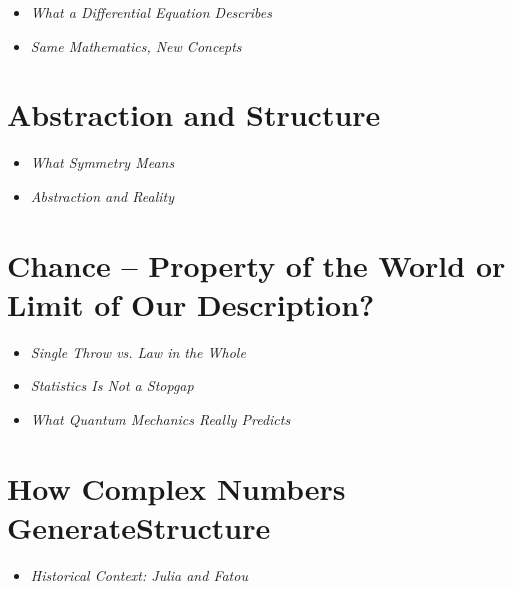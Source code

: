 \begin{DidacticBox}
	\begin{itemize}
		\item \emph{What a Differential Equation Describes}\dotfill \pageref{box:differential}
		\item \emph{Same Mathematics, New Concepts}\dotfill \pageref{box:newconcepts}
	\end{itemize}
\end{DidacticBox}

\section{Abstraction and Structure}
\begin{DidacticBox}
	\begin{itemize}
		\item \emph{What Symmetry Means}\dotfill \pageref{box:symmetry}
		\item \emph{Abstraction and Reality}\dotfill \pageref{box:abstraction}
	\end{itemize}
\end{DidacticBox}

\section{Chance -- Property of the World or Limit of Our Description?}

\begin{DidacticBox}
	\begin{itemize}
		\item \emph{Single Throw vs. Law in the Whole}\dotfill \pageref{box:singlethrow}
		\item \emph{Statistics Is Not a Stopgap}\dotfill \pageref{box:statistics}
		\item \emph{What Quantum Mechanics Really Predicts}\dotfill \pageref{box:predicts}
	\end{itemize}
\end{DidacticBox}

\section{How Complex Numbers Generate\newline Structure}

\begin{HistoryBox}
	
	\begin{itemize}
		\item \emph{Historical Context: Julia and Fatou}\dotfill \pageref{box:julia}
	\end{itemize}
\end{HistoryBox}

